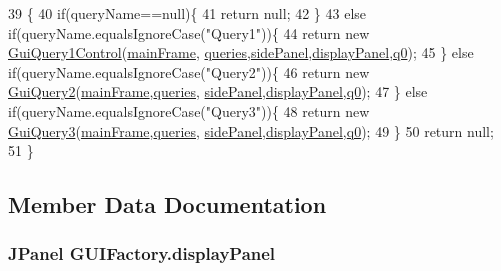 \begin{DoxyCode}
39     \{
40         \textcolor{keywordflow}{if}(queryName==null)\{
41             \textcolor{keywordflow}{return} null;
42         \}
43         \textcolor{keywordflow}{else} \textcolor{keywordflow}{if}(queryName.equalsIgnoreCase(\textcolor{stringliteral}{"Query1"}))\{
44             \textcolor{keywordflow}{return} \textcolor{keyword}{new} \hyperlink{classGuiQuery1Control}{GuiQuery1Control}(\hyperlink{classGUIFactory_afb70d82da7ea373c87a3cb8c2f6eb075}{mainFrame},
      \hyperlink{classGUIFactory_a244f5c63e4a280528e2b08316a652287}{queries},\hyperlink{classGUIFactory_a76d0958fe1b53efd8953c3744fc9db01}{sidePanel},\hyperlink{classGUIFactory_aa9d579163a66ea0c377f2dc87f9449dd}{displayPanel},\hyperlink{classGUIFactory_a6f1a7d65f7a410b4a47ce24164e1d594}{q0});
45         \} \textcolor{keywordflow}{else} \textcolor{keywordflow}{if}(queryName.equalsIgnoreCase(\textcolor{stringliteral}{"Query2"}))\{
46             \textcolor{keywordflow}{return} \textcolor{keyword}{new} \hyperlink{classGuiQuery2}{GuiQuery2}(\hyperlink{classGUIFactory_afb70d82da7ea373c87a3cb8c2f6eb075}{mainFrame},\hyperlink{classGUIFactory_a244f5c63e4a280528e2b08316a652287}{queries},
      \hyperlink{classGUIFactory_a76d0958fe1b53efd8953c3744fc9db01}{sidePanel},\hyperlink{classGUIFactory_aa9d579163a66ea0c377f2dc87f9449dd}{displayPanel},\hyperlink{classGUIFactory_a6f1a7d65f7a410b4a47ce24164e1d594}{q0});
47         \} \textcolor{keywordflow}{else} \textcolor{keywordflow}{if}(queryName.equalsIgnoreCase(\textcolor{stringliteral}{"Query3"}))\{
48             \textcolor{keywordflow}{return} \textcolor{keyword}{new} \hyperlink{classGuiQuery3}{GuiQuery3}(\hyperlink{classGUIFactory_afb70d82da7ea373c87a3cb8c2f6eb075}{mainFrame},\hyperlink{classGUIFactory_a244f5c63e4a280528e2b08316a652287}{queries},
      \hyperlink{classGUIFactory_a76d0958fe1b53efd8953c3744fc9db01}{sidePanel},\hyperlink{classGUIFactory_aa9d579163a66ea0c377f2dc87f9449dd}{displayPanel},\hyperlink{classGUIFactory_a6f1a7d65f7a410b4a47ce24164e1d594}{q0});
49         \}
50         \textcolor{keywordflow}{return} null;
51     \}
\end{DoxyCode}


\subsection{Member Data Documentation}
\subsubsection[{\texorpdfstring{display\+Panel}{displayPanel}}]{\setlength{\rightskip}{0pt plus 5cm}J\+Panel G\+U\+I\+Factory.\+display\+Panel\hspace{0.3cm}{\ttfamily [private]}}\hypertarget{classGUIFactory_aa9d579163a66ea0c377f2dc87f9449dd}{}\label{classGUIFactory_aa9d579163a66ea0c377f2dc87f9449dd}
